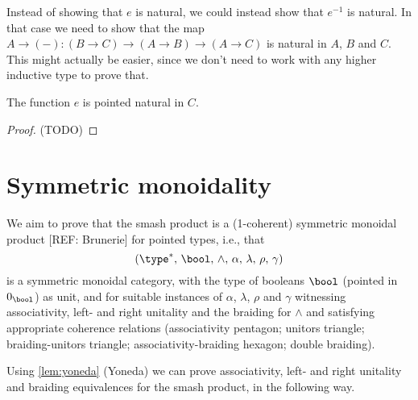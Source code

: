 \documentclass{article}
\newcommand{\smsh}{\wedge}
\begin{document}
\begin{rmk}
  Instead of showing that $e$ is natural, we could instead show that $e^{-1}$ is natural. In
  that case we need to show that the map $A\to({-}):(B\to C)\to(A\to B)\to(A\to C)$ is natural in
  $A$, $B$ and $C$. This might actually be easier, since we don't need to work with any higher
  inductive type to prove that.
\end{rmk}

\begin{lem}\label{lem:e-pointed-natural}
	The function $e$ is pointed natural in $C$.
\end{lem}

\begin{proof}
	(TODO)
\end{proof}

\section{Symmetric monoidality}
We aim to prove that the smash product is a (1-coherent) symmetric monoidal product [REF: Brunerie] for pointed types, i.e., that
\[(\type^*,\, \bool,\, \smsh,\, \alpha,\, \lambda,\, \rho,\, \gamma)\]
is a symmetric monoidal category, with the type of booleans $\bool$ (pointed in $0_\bool$) as unit, and for suitable instances of $\alpha$, $\lambda$, $\rho$ and $\gamma$ witnessing associativity, left- and right unitality and the braiding for $\smsh$ and satisfying appropriate coherence relations (associativity pentagon; unitors triangle; braiding-unitors triangle; associativity-braiding hexagon; double braiding).

Using \autoref{lem:yoneda} (Yoneda) we can prove associativity, left- and right unitality and braiding equivalences for the smash product, in the following way.
\end{document}
